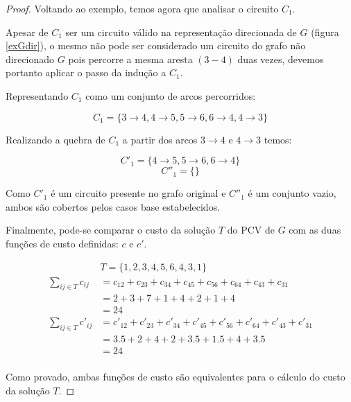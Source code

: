 \begin{proof}
            Voltando ao exemplo, temos agora que analisar o circuito $C_1$.

            Apesar de $C_1$ ser um circuito válido na representação direcionada de $G$ (figura \ref{exGdir}), o mesmo não pode ser considerado um circuito do grafo não direcionado $G$ pois percorre a mesma aresta $(3 - 4)$ duas vezes, devemos portanto aplicar o passo da indução a $C_1$.
            
            Representando $C_1$ como um conjunto de arcos percorridos:

            \[
                C_1 = \{ 3\rightarrow 4, 4\rightarrow 5, 5\rightarrow 6, 6\rightarrow 4, 4\rightarrow 3 \}                
            \]

            Realizando a quebra de $C_1$ a partir dos arcos $3 \rightarrow 4$ e $4 \rightarrow 3$ temos:

            \[
                C'_1  = \{4 \rightarrow 5, 5\rightarrow 6, 6\rightarrow 4\}
            \]
            \[
                C''_1 = \{\}
            \] 

            Como $C'_1$ é um circuito presente no grafo original e $C''_1$ é um conjunto vazio, ambos são cobertos pelos casos base estabelecidos.

            Finalmente, pode-se comparar o custo da solução $T$ do PCV de $G$ com as duas funções de custo definidas: $c$ e $c'$.

            \begin{align*}
                & T = \{ 1, 2, 3, 4, 5, 6, 4, 3, 1\} \\
                \sum_{ij \in T} c_{ij} &= c_{12} + c_{23} + c_{34} + c_{45} + c_{56} + c_{64} + c_{43} + c_{31} \\
                &= 2 + 3 + 7 + 1 + 4 + 2 + 1 + 4 \\
                &= 24 \\
                \sum_{ij \in T} c'_{ij} &= c'_{12} + c'_{23} + c'_{34} + c'_{45} + c'_{56} + c'_{64} + c'_{43} + c'_{31} \\
                &= 3.5 + 2 + 4 + 2 + 3.5 + 1.5 + 4 + 3.5 \\
                &= 24 \\
            \end{align*}

            Como provado, ambas funções de custo são equivalentes para o cálculo do custo da solução $T$.
        \end{proof}

%
%
